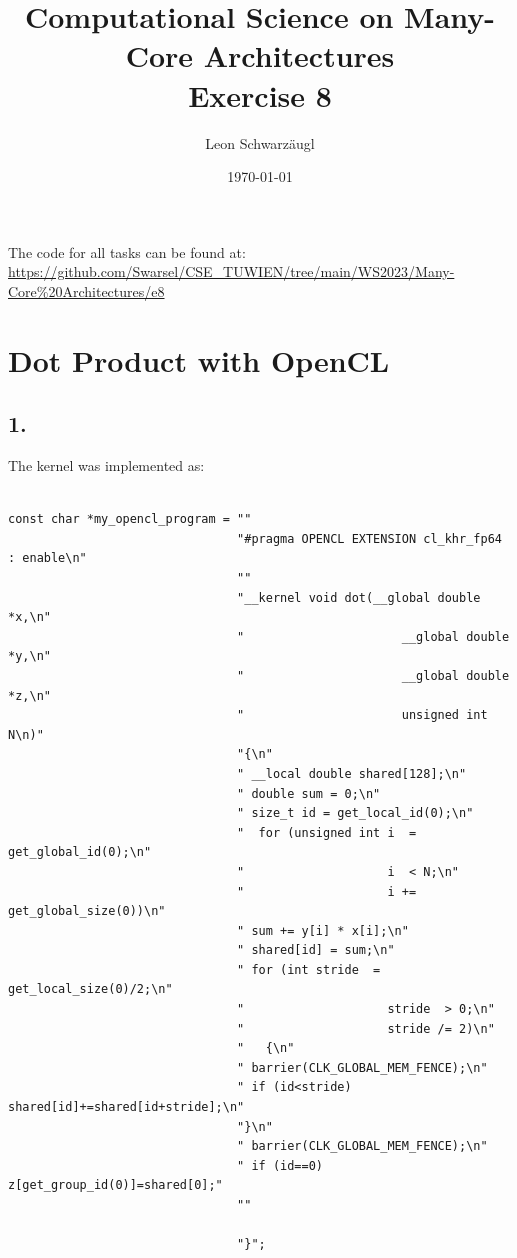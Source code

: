 \documentclass[11pt]{article}
\author{Leon Schwarzäugl}
\date{\today}
\title{Computational Science on Many-Core Architectures \\Exercise 8}
\begin{document}
\maketitle
The code for all tasks can be found at: \url{https://github.com/Swarsel/CSE_TUWIEN/tree/main/WS2023/Many-Core%20Architectures/e8}

\newpage
\section{Dot Product with OpenCL}
\subsection{1.}
The kernel was implemented as:
\begin{small}
\begin{verbatim}

const char *my_opencl_program = ""
                                "#pragma OPENCL EXTENSION cl_khr_fp64 : enable\n"
                                ""
                                "__kernel void dot(__global double *x,\n"
                                "                      __global double *y,\n"
                                "                      __global double *z,\n"
                                "                      unsigned int N\n)"
                                "{\n"
                                " __local double shared[128];\n"
                                " double sum = 0;\n"
                                " size_t id = get_local_id(0);\n"
                                "  for (unsigned int i  = get_global_id(0);\n"
                                "                    i  < N;\n"
                                "                    i += get_global_size(0))\n"
                                " sum += y[i] * x[i];\n"
                                " shared[id] = sum;\n"
                                " for (int stride  = get_local_size(0)/2;\n"
                                "                    stride  > 0;\n"
                                "                    stride /= 2)\n"
                                "   {\n"
                                " barrier(CLK_GLOBAL_MEM_FENCE);\n"
                                " if (id<stride) shared[id]+=shared[id+stride];\n"
                                "}\n"
                                " barrier(CLK_GLOBAL_MEM_FENCE);\n"
                                " if (id==0) z[get_group_id(0)]=shared[0];"
                                ""

                                "}";
\end{verbatim}
\end{small}
\newpage
\end{document}
